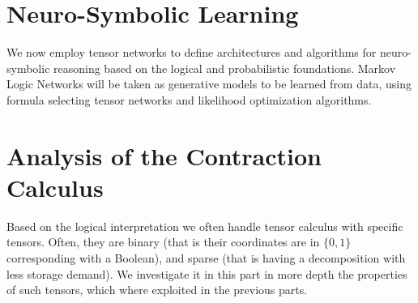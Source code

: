\documentclass[aps,onecolumn,nofootinbib,pra]{article}
\begin{document}
\part{Neuro-Symbolic Learning}

We now employ tensor networks to define architectures and algorithms for neuro-symbolic reasoning based on the logical and probabilistic foundations.
Markov Logic Networks will be taken as generative models to be learned from data, using formula selecting tensor networks and likelihood optimization algorithms.















\part{Analysis of the Contraction Calculus}

Based on the logical interpretation we often handle tensor calculus with specific tensors.
Often, they are binary (that is their coordinates are in $\{0,1\}$ corresponding with a Boolean), and sparse (that is having a decomposition with less storage demand).
We investigate it in this part in more depth the properties of such tensors, which where exploited in the previous parts.




%














\appendix




\end{document}
